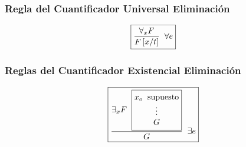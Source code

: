 \subsubsection{Regla del Cuantificador Universal Eliminación}
\[
        \boxed{\frac{\forall_x F}{F\left [ x/t \right ]} \hspace{2mm} \forall e
        }\]
\subsubsection{Reglas del Cuantificador Existencial Eliminación}
\[
        \boxed{\frac{\exists_x F\hspace{2mm}\boxed{\begin{matrix}
                                        x_o \hspace{2mm}\text{supuesto} \\
                                        \vdots                          \\
                                        G
                                \end{matrix}}}{G} \hspace{2mm} \exists e}
\]
